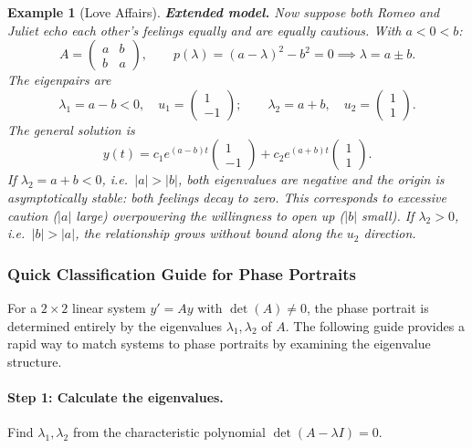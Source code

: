 \documentclass{article}
\newtheorem*{example}{Example}
\begin{document}
\begin{example}[Love Affairs]
    \textbf{Extended model.} Now suppose both Romeo and Juliet 
    echo each other's feelings equally and are equally cautious. 
    With $a < 0 < b$:
    \[A = \begin{pmatrix}a&b\\b&a\end{pmatrix}, \qquad 
    p(\lambda) = (a-\lambda)^2 - b^2 = 0 \implies 
    \lambda = a \pm b.\]
    The eigenpairs are
    \[\lambda_1 = a - b < 0, \quad u_1 = \begin{pmatrix}1\\-1
    \end{pmatrix}; \qquad \lambda_2 = a + b, \quad 
    u_2 = \begin{pmatrix}1\\1\end{pmatrix}.\]
    The general solution is
    \[y(t) = c_1 e^{(a-b)t}\begin{pmatrix}1\\-1\end{pmatrix} + 
    c_2 e^{(a+b)t}\begin{pmatrix}1\\1\end{pmatrix}.\]
    If $\lambda_2 = a + b < 0$, i.e.\ $|a| > |b|$, both 
    eigenvalues are negative and the origin is asymptotically 
    stable: both feelings decay to zero. This corresponds to 
    excessive caution ($|a|$ large) overpowering the willingness 
    to open up ($|b|$ small). If $\lambda_2 > 0$, i.e.\ $|b| > |a|$,
    the relationship grows without bound along the $u_2$ direction.
\end{example}

\subsubsection{Quick Classification Guide for Phase Portraits}

For a $2 \times 2$ linear system $y' = Ay$ with $\det(A) \neq 0$, the phase portrait is determined entirely by the eigenvalues $\lambda_1, \lambda_2$ of $A$. The following guide provides a rapid way to match systems to phase portraits by examining the eigenvalue structure.

\paragraph{Step 1: Calculate the eigenvalues.}
Find $\lambda_1, \lambda_2$ from the characteristic polynomial $\det(A - \lambda I) = 0$.
\end{document}
